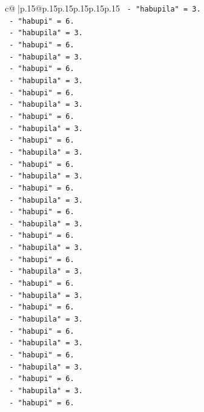 \documentclass{article}
\begin{document}
{\begin{supertabular}{c@{$\;$}|p{.15\linewidth}@{}p{.15\linewidth}p{.15\linewidth}p{.15\linewidth}p{.15\linewidth}p{.15\linewidth}}
{{{\texttt{       {-} "habupila" = 3.} \\
\texttt{       {-} "habupi" = 6.} \\
\texttt{       {-} "habupila" = 3.} \\
\texttt{       {-} "habupi" = 6.} \\
\texttt{       {-} "habupila" = 3.} \\
\texttt{       {-} "habupi" = 6.} \\
\texttt{       {-} "habupila" = 3.} \\
\texttt{       {-} "habupi" = 6.} \\
\texttt{       {-} "habupila" = 3.} \\
\texttt{       {-} "habupi" = 6.} \\
\texttt{       {-} "habupila" = 3.} \\
\texttt{       {-} "habupi" = 6.} \\
\texttt{       {-} "habupila" = 3.} \\
\texttt{       {-} "habupi" = 6.} \\
\texttt{       {-} "habupila" = 3.} \\
\texttt{       {-} "habupi" = 6.} \\
\texttt{       {-} "habupila" = 3.} \\
\texttt{       {-} "habupi" = 6.} \\
\texttt{       {-} "habupila" = 3.} \\
\texttt{       {-} "habupi" = 6.} \\
\texttt{       {-} "habupila" = 3.} \\
\texttt{       {-} "habupi" = 6.} \\
\texttt{       {-} "habupila" = 3.} \\
\texttt{       {-} "habupi" = 6.} \\
\texttt{       {-} "habupila" = 3.} \\
\texttt{       {-} "habupi" = 6.} \\
\texttt{       {-} "habupila" = 3.} \\
\texttt{       {-} "habupi" = 6.} \\
\texttt{       {-} "habupila" = 3.} \\
\texttt{       {-} "habupi" = 6.} \\
\texttt{       {-} "habupila" = 3.} \\
\texttt{       {-} "habupi" = 6.} \\
\texttt{       {-} "habupila" = 3.} \\
\texttt{       {-} "habupi" = 6.} \\
}}}
\end{supertabular}}
\end{document}
